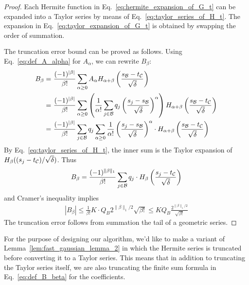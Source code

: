 \begin{proof}
Each Hermite function in Eq.~\eqref{eq:hermite_expansion_of_G_t} can be expanded into a Taylor series by means of Eq.~\eqref{eq:taylor_series_of_H_t}. The expansion in Eq.~\eqref{eq:taylor_expansion_of_G_t} is obtained by swapping the order of summation. 

The truncation error bound can be proved as follows. Using Eq.~\eqref{eq:def_A_alpha} for $A_{\alpha}$, we can rewrite $B_{\beta}$:
\begin{align*}
B_{\beta} = & ~ \frac{ (-1)^{|\beta|} }{ \beta ! } \sum_{\alpha \geq 0} A_{\alpha} H_{\alpha + \beta} \left( \frac{ s_{\cal B} - t_{\cal C} }{ \sqrt{\delta} } \right) \\
= & ~ \frac{ (-1)^{|\beta|} }{ \beta ! } \sum_{\alpha \geq 0} \left( \frac{1}{ \alpha ! } \sum_{j \in {\cal B} } q_j \left( \frac{ s_j - s_{\cal B} }{ \sqrt{\delta} } \right)^{\alpha} \right) H_{\alpha + \beta} \left( \frac{ s_{\cal B} - t_{\cal C} }{ \sqrt{\delta} } \right) \\
= & ~ \frac{ (-1)^{|\beta|} }{ \beta ! } \sum_{j \in {\cal B} } q_j \sum_{\alpha \geq 0 } \frac{1}{ \alpha !} \left( \frac{s_j - s_{\cal B} }{ \sqrt{\delta} } \right)^{\alpha} \cdot H_{\alpha + \beta} \left( \frac{ s_{\cal B} - t_{\cal C} }{ \sqrt{\delta} } \right)
\end{align*}
By Eq.~\eqref{eq:taylor_series_of_H_t}, the inner sum is the Taylor expansion of $H_{\beta} ( (s_j - t_{\cal C}) / \sqrt{\delta} )$. Thus
\begin{align*}
B_{\beta} = \frac{ (-1)^{\|\beta\|_1} }{ \beta ! } \sum_{j \in {\cal B} } q_j \cdot H_{\beta} \left( \frac{ s_j - t_{\cal C} }{ \sqrt{\delta} } \right)
\end{align*}
and Cramer's inequality implies
\begin{align*}
| B_{\beta} | \leq \frac{1}{\beta !} K \cdot Q_B 2^{\|\beta\|_1/2} \sqrt{\beta !} \leq K Q_B \frac{ 2^{ \| \beta \|_1 / 2 } }{ \sqrt{\beta !} }
\end{align*}
The truncation error follows from summation the tail of a geometric series.
\end{proof}

For the purpose of designing our algorithm, we'd like to make a variant of Lemma~\ref{lem:fast_gaussian_lemma_2} in which the Hermite series is truncated before converting it to a Taylor series. This means that in addition to truncating the Taylor series itself, we are also truncating the finite sum formula in Eq.~\eqref{eq:def_B_beta} for the coefficients. 

